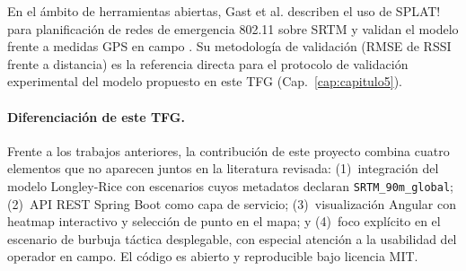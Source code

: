En el ámbito de herramientas abiertas, Gast et al. describen el uso de SPLAT! para
planificación de redes de emergencia 802.11 sobre SRTM y validan el modelo frente a
medidas GPS en campo \cite{gast2005wifi}. Su metodología de validación (RMSE de RSSI
frente a distancia) es la referencia directa para el protocolo de validación experimental
del modelo propuesto en este TFG (Cap.~\ref{cap:capitulo5}).

\paragraph{Diferenciación de este TFG.} Frente a los trabajos anteriores, la contribución
de este proyecto combina cuatro elementos que no aparecen juntos en la literatura revisada:
(1)~integración del modelo Longley-Rice con escenarios cuyos metadatos declaran
\texttt{SRTM\_90m\_global}; (2)~API REST Spring Boot como capa de servicio; (3)~visualización
Angular con heatmap interactivo y selección de punto en el mapa; y (4)~foco explícito en
el escenario de burbuja táctica desplegable, con especial atención a la usabilidad del
operador en campo. El código es abierto y reproducible bajo licencia MIT.
